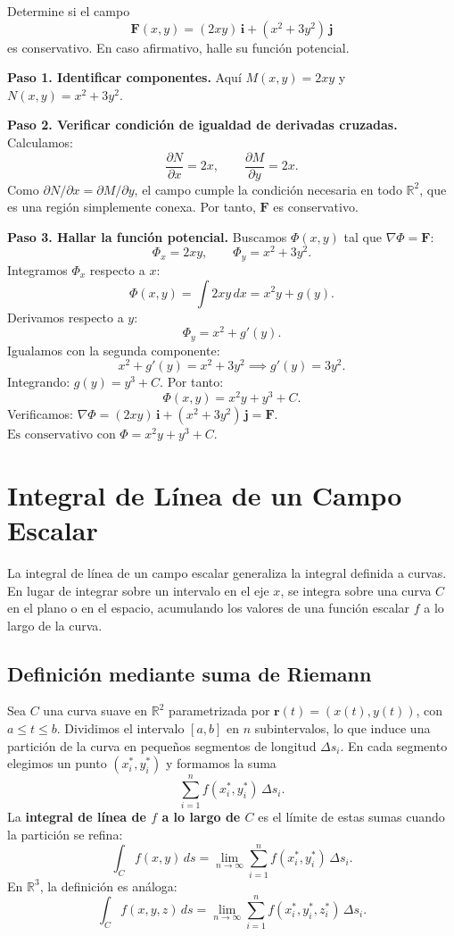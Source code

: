 \begin{example}
Determine si el campo
\[
\mathbf{F}(x,y) = (2x y)\,\mathbf{i} + (x^2 + 3y^2)\,\mathbf{j}
\]
es conservativo. En caso afirmativo, halle su función potencial.
\begin{myproof}
\textbf{Paso 1. Identificar componentes.}
Aquí \(M(x,y) = 2xy\) y \(N(x,y) = x^2 + 3y^2\).

\textbf{Paso 2. Verificar condición de igualdad de derivadas cruzadas.}
Calculamos:
\[
\frac{\partial N}{\partial x} = 2x, \qquad
\frac{\partial M}{\partial y} = 2x.
\]
Como \(\partial N/\partial x = \partial M/\partial y\), el campo
cumple la condición necesaria en todo \(\mathbb{R}^2\), que es una
región simplemente conexa. Por tanto, \(\mathbf{F}\) es conservativo.

\textbf{Paso 3. Hallar la función potencial.}
Buscamos \(\Phi(x,y)\) tal que \(\nabla \Phi = \mathbf{F}\):
\[
\Phi_x = 2xy, \qquad \Phi_y = x^2 + 3y^2.
\]
Integramos \(\Phi_x\) respecto a \(x\):
\[
\Phi(x,y) = \int 2xy \, dx = x^2 y + g(y).
\]
Derivamos respecto a \(y\):
\[
\Phi_y = x^2 + g'(y).
\]
Igualamos con la segunda componente:
\[
x^2 + g'(y) = x^2 + 3y^2 \implies g'(y) = 3y^2.
\]
Integrando: \(g(y) = y^3 + C\). Por tanto:
\[
\Phi(x,y) = x^2 y + y^3 + C.
\]
Verificamos: \(\nabla \Phi = (2xy)\,\mathbf{i} + (x^2+3y^2)\,\mathbf{j}
= \mathbf{F}\). \(\boxed{\text{Es conservativo con } \Phi = x^2 y + y^3 + C}\).
\end{myproof}
\end{example}

\section{Integral de Línea de un Campo Escalar}

La integral de línea de un campo escalar generaliza la integral
definida a curvas. En lugar de integrar sobre un intervalo en el eje
\(x\), se integra sobre una curva \(C\) en el plano o en el espacio,
acumulando los valores de una función escalar \(f\) a lo largo de la
curva.

\subsection*{Definición mediante suma de Riemann}

Sea \(C\) una curva suave en \(\mathbb{R}^2\) parametrizada por
\(\mathbf{r}(t) = (x(t), y(t))\), con \(a \le t \le b\). Dividimos
el intervalo \([a,b]\) en \(n\) subintervalos, lo que induce una
partición de la curva en pequeños segmentos de longitud \(\Delta s_i\).
En cada segmento elegimos un punto \((x_i^*, y_i^*)\) y formamos la
suma
\[
\sum_{i=1}^n f(x_i^*, y_i^*) \,\Delta s_i.
\]
La \textbf{integral de línea de \(f\) a lo largo de \(C\)} es el
límite de estas sumas cuando la partición se refina:
\[
\int_C f(x,y)\,ds = \lim_{n\to\infty}
\sum_{i=1}^n f(x_i^*, y_i^*) \,\Delta s_i.
\]
En \(\mathbb{R}^3\), la definición es análoga:
\[
\int_C f(x,y,z)\,ds = \lim_{n\to\infty}
\sum_{i=1}^n f(x_i^*, y_i^*, z_i^*) \,\Delta s_i.
\]

